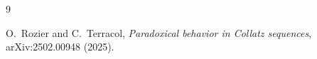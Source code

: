 \documentclass[11pt]{amsart}
\theoremstyle{plain}
\theoremstyle{definition}
\theoremstyle{remark}
\begin{document}

\begin{thebibliography}{9}

O.~Rozier and C.~Terracol,
\emph{Paradoxical behavior in Collatz sequences},
arXiv:2502.00948 (2025).

\end{thebibliography}
\end{document}
